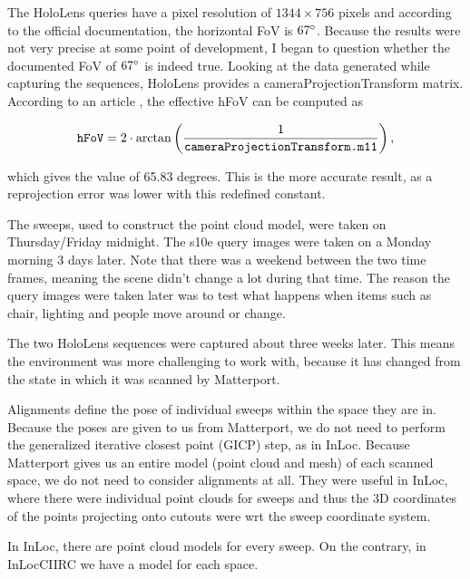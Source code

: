 \documentclass[twoside]{ctuthesis}
\theoremstyle{plain}
\theoremstyle{definition}
\theoremstyle{note}
\newcommand{\code}[1]{{\ttfamily #1%
}}
\begin{document}
The HoloLens queries have a pixel resolution of $1344 \times 756$ pixels and according to the official documentation, the horizontal FoV is $67\degree$. Because the results were not very precise at some point of development, I began to question whether the documented FoV of $67\degree$ is indeed true. Looking at the data generated while capturing the sequences, HoloLens provides a \code{cameraProjectionTransform} matrix. According to an article \cite{HoloLensFoV}, the effective hFoV can be computed as

\begin{equation}
	\text{\code{hFoV}} = 2 \cdot \arctan \left(\frac{1}{\text{\code{cameraProjectionTransform.m11}}}\right),
\end{equation}

which gives the value of 65.83 degrees. This is the more accurate result, as a reprojection error was lower with this redefined constant.

The sweeps, used to construct the point cloud model, were taken on Thursday/Friday midnight. The s10e query images were taken on a Monday morning 3 days later. Note that there was a weekend between the two time frames, meaning the scene didn't change a lot during that time. The reason the query images were taken later was to test what happens when items such as chair, lighting and people move around or change.

The two HoloLens sequences were captured about three weeks later. This means the environment was more challenging to work with, because it has changed from the state in which it was scanned by Matterport.

Alignments define the pose of individual sweeps within the space they are in. Because the poses are given to us from Matterport, we do not need to perform the generalized iterative closest point (GICP) step, as in InLoc. Because Matterport gives us an entire model (point cloud and mesh) of each scanned space, we do not need to consider alignments at all. They were useful in InLoc, where there were individual point clouds for sweeps and thus the 3D coordinates of the points projecting onto cutouts were wrt the sweep coordinate system.

In InLoc, there are point cloud models for every sweep. On the contrary, in InLocCIIRC we have a model for each space.
\end{document}
